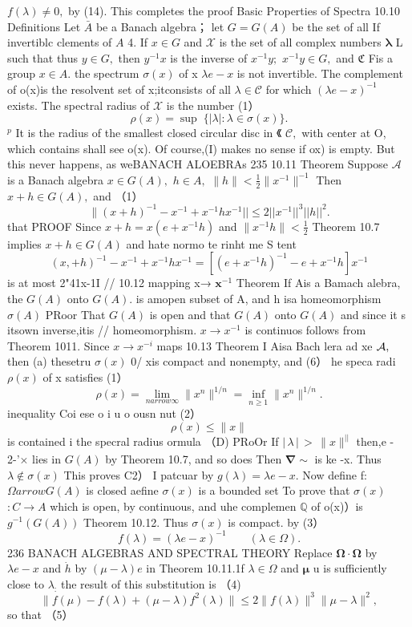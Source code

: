 $f(\lambda)\neq0,$ by (14). This completes the proof Basic Properties of Spectra 10.10 Definitions Let $\bar{A}$ be a Banach algebra； let $G=G(A)$ be the set of all If invertiblc clements of $\textstyle A$ 4. If $x\in G$ and $\textstyle{\mathcal{X}}$ is the set of all complex numbers $\boldsymbol{\lambda}$ L such that thus $y\in G,$ then $y^{-1}x$ is the inverse of $x^{-1}y;$ $x^{-1}y\in G,$ and ${\mathfrak{C}}$ Fis a group $x\in A.$ the spectrum $\sigma(x)$ of x $\lambda e-x$ is not invertible. The complement of o(x)is the resolvent set of x;itconsists of all $\lambda\in{\mathcal{C}}$ for which $\scriptstyle\left(\lambda e-x\right)^{-1}$ exists. The spectral radius of $\textstyle{\mathcal{X}}$ is the number (1） $$ \rho(x)=\operatorname*{sup}\;\{|\lambda|:\lambda\in\sigma(x)\}. $$ $^{p}$ It is the radius of the smallest closed circular disc in 《 ${\mathcal{C}},$ with center at O, which contains shall see o(x). Of course,(I) makes no sense if ox) is empty. But this never happens, as weBANACH ALOEBRAs 235 10.11 Theorem Suppose $\textstyle{\mathcal{A}}$ is a Banach algebra $x\in G(A),\,\,h\in A,\,\,\|h\|<\frac{1}{2}\|x^{-1}\|^{-1}$ Then $x+h\in G(A),$ and （1） $$ \|(x+h)^{-1}-x^{-1}+x^{-1}h x^{-1}||\leq2||x^{-1}||^{3}||h||^{2}. $$ that PROOF Since $x+h=x(e+x^{-1}h)$ and $\|x^{-1}h\|<{\frac{1}{2}}$ Theorem 10.7 implies $x+h\in G(A)$ and hate normo te rinht me S tent $$ (x,+h)^{-1}-x^{-1}+x^{-1}h x^{-1}=[(e+x^{-1}h)^{-1}-e+x^{-1}h]x^{-1} $$ is at most 2"41x-1I // 10.12 mapping x→ ${\boldsymbol{x}}^{-1}$ Theorem If Ais a Bamach alebra, the $G(A)$ onto $G(A).$ is amopen subset of A, and h isa homeomorphism $\sigma(A)$ PRoor That $G(A)$ is open and that $G(A)$ onto $\scriptstyle{G(A)}$ and since it s itsown inverse,itis // homeomorphism. $x\to x^{-1}$ is continuos follows from Theorem 1011. Since $x\to x^{-i}$ maps 10.13 Theorem I Aisa Bach lera ad xe ${\cal A},$ then (a) thesetru $\scriptstyle{\sigma(x)}$ 0/ xis compact and nonempty, and (6） he speca radi $\rho(x)$ of x satisfies (1） $$ \rho(x)=\operatorname*{lim}_{n arrow\infty}\|x^{n}\|^{1/n}=\operatorname*{inf}_{n\ge1}\|x^{n}\|^{1/n}. $$ inequality Coi ese o i u o ousn nut (2） $$ \rho(x)\leq\lVert x\rVert $$ is contained i the specral radius ormula （D) PRoOr If $|\,\lambda\,|\,>\,\|x\|_{}^{||}$ then,e - 2-'× lies in $G(A)$ by Theorem 10.7, and so does Then $\mathbf{\nabla}\sim{\mathbf{}}$ is ke -x. Thus $\lambda\not\in\sigma(x)$ This proves C2） I patcuar by $g(\lambda)=\lambda e-x.$ Now define f: $\Omega arrow G(A)$ is closed aefine $\sigma(x)$ is a bounded set To prove that $\scriptstyle{\sigma(x)}$ $:C\to A$ which is open, by continuous, and uhe complemen $\mathbb{Q}$ of o(x)）is $g^{-1}(G(A))$ Theorem 10.12. Thus $\sigma(x)$ is compact. by (3） $$ f(\lambda)=(\lambda e-x)^{-1}\qquad(\lambda\in\Omega). $$236 BANACH ALGEBRAS AND SPECTRAL THEORY Replace $\mathbf{\Omega}\cdot\mathbf{\Omega}$ by $\lambda e-x$ and $\dot{h}$ by $(\mu-\lambda)e$ in Theorem 10.11.1f $\lambda\in\Omega$ and $\boldsymbol{\mu}$ u is sufficiently close to $\lambda_{\mathrm{:}}$ the result of this substitution is （4) $$ \|f(\mu)-f(\lambda)+(\mu-\lambda)f^{2}(\lambda)\|\leq2\|f(\lambda)\|^{3}\|\mu-\lambda\|^{2}, $$ so that （5） $$ 